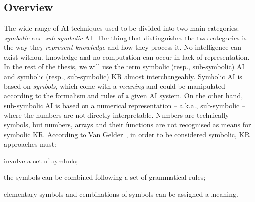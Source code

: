 
\chapter[Artificial Intelligence]{}
\label{ch:ai}
\minitoc

\section{Overview}\label{sec:ai-overview}
%
The wide range of \gls{AI} techniques used to be divided into two main categories: \emph{symbolic} and \emph{sub-symbolic} \gls{AI}.
%
The thing that distinguishes the two categories is the way they \emph{represent knowledge} and how they process it.
%
No intelligence can exist without knowledge and no computation can occur in lack of representation.
%
In the rest of the thesis, we will use the term symbolic (resp., sub-symbolic) \gls{AI} and symbolic (resp., sub-symbolic) \gls{KR} almost interchangeably.
%
Symbolic \gls{AI} is based on \emph{symbols}, which come with a \emph{meaning} and could be manipulated according to the formalism and rules of a given \gls{AI} system.
%
On the other hand, sub-symbolic \gls{AI} is based on a numerical representation -- a.k.a., sub-symbolic -- where the numbers are not directly interpretable.
%
Numbers are technically symbols, but numbers, arrays and their functions are not recognised as means for symbolic \gls{KR}.
%
According to Van Gelder~\cite{DBLP:conf/ogai/Gelder90}, in order to be considered symbolic, \gls{KR} approaches must:
%
\begin{requirements}
    \item \label{itm:symbolic-req-1} involve a set of symbols;
    \item \label{itm:symbolic-req-2} the symbols can be combined following a set of grammatical rules;
    \item \label{itm:symbolic-req-3} elementary symbols and combinations of symbols can be assigned a meaning.
\end{requirements}


